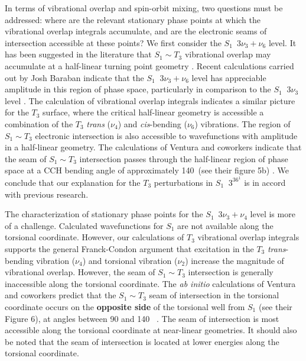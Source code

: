 \documentclass[12pt]{mitthesis}
\begin{document}
In terms of vibrational overlap and spin-orbit mixing, two questions
must be addressed: where are the relevant stationary phase points at
which the vibrational overlap integrals accumulate, and are the
electronic seams of intersection accessible at these points?  We first
consider the $S_1 \:\; 3\nu_3 + \nu_6$ level.  It has been suggested
in the literature that $S_1 \sim T_3$ vibrational overlap may
accumulate at a half-linear turning point geometry \cite{mizoguchi00}.
Recent calculations carried out by Josh Baraban indicate that the $S_1
\;\; 3\nu_3 + \nu_6$ level has appreciable amplitude in this region of
phase space, particularly in comparison to the $S_1 \;\; 3\nu_3$ level
\cite{baraban08}.  The calculation of vibrational overlap integrals
indicates a similar picture for the $T_3$ surface, where the critical
half-linear geometry is accessible a combination of the $T_3$
\emph{trans} ($\nu_4$) and \emph{cis}-bending ($\nu_6$) vibrations.
The region of $S_1 \sim T_3$ electronic intersection is also
accessible to wavefunctions with amplitude in a half-linear geometry.
The calculations of Ventura and coworkers indicate that the seam of
$S_1 \sim T_3$ intersection passes through the half-linear region of
phase space at a CCH bending angle of approximately 140\degrees\ (see
their figure 5b) \cite{ventura03}.  We conclude that our explanation
for the $T_3$ perturbations in $S_1 \;\; 3^36^1$  is in accord
with previous research.

The characterization of stationary phase points for the $S_1 \:\;
3\nu_3 + \nu_4$ level is more of a challenge.  Calculated
wavefunctions for $S_1$ are not available along the torsional
coordinate.  However, our calculations of $T_3$ vibrational overlap
integrals supports the general Franck-Condon argument that excitation
in the $T_3$ \emph{trans}-bending vibration ($\nu_4$) and torsional
vibration ($\nu_2$) increase the magnitude of vibrational overlap.
However, the seam of $S_1 \sim T_3$ intersection is generally
inaccessible along the torsional coordinate.  The \emph{ab initio}
calculations of Ventura and coworkers predict that the $S_1 \sim T_3$
seam of intersection in the torsional coordinate occurs on the
\textbf{opposite side} of the torsional well from $S_1$ (see their
Figure 6), at angles between 90 and 140 \degrees\ \cite{ventura03}.
The seam of intersection is most accessible along the torsional
coordinate at near-linear geometries.  It should also be noted
that the seam of intersection is located at lower energies along the
torsional coordinate.
\end{document}
